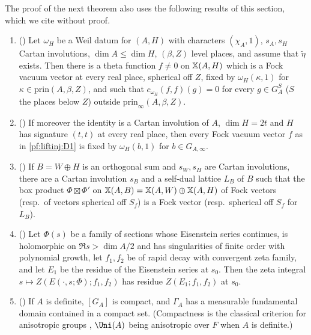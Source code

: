 The proof of the next theorem also uses the following results of this section, which we cite without proof.
\begin{enumerate}[label=(D\arabic*)]
\item\label{pf:liftinj:D1} () Let $\omega_H$ be a Weil datum for
$(A,H)$ with characters $(\chi_A,1)$, $s_A,s_H$ Cartan involutions, $\dim A\le\dim H$, $(\beta,Z)$ level places, and assume that
$\tilde\eta$ exists. Then there is a theta function $f\ne0$ on $\mathbb{X}(A,H)$ which is a Fock vacuum vector at every real place, spherical
off $Z$, fixed by $\omega_H(\kappa,1)$ for $\kappa\in\mathrm{prin}(A,\beta,Z)$, and such that $c_{\omega_H}(f,f)(g)=0$ for every $g\in G_A^{S}$
($S$ the places below $Z$) outside $\mathrm{prin}_\infty(A,\beta,Z)$.
\item\label{pf:liftinj:D2} () If moreover the identity is a Cartan
involution of $A$, $\dim H=2t$ and $H$ has signature $(t,t)$ at every real place, then every Fock vacuum vector $f$ as in \ref{pf:liftinj:D1} is fixed
by $\omega_H(b,1)$ for $b\in G_{A,\infty}$.
\item\label{pf:liftinj:D3} () If $B=W\oplus H$ is an orthogonal sum and
$s_W,s_H$ are Cartan involutions, there are a Cartan involution $s_B$ and a self-dual lattice $L_B$ of $B$ such that the box product
$\Phi\boxtimes\Phi'$ on $\mathbb{X}(A,B)=\mathbb{X}(A,W)\oplus\mathbb{X}(A,H)$ of Fock vectors (resp.\ of vectors spherical off $S_f$) is a Fock
vector (resp.\ spherical off $S_f$ for $L_B$).
\item\label{pf:liftinj:D4} () Let $\Phi(s)$ be a family of sections whose
Eisenstein series continues, is holomorphic on $\Re s>\dim A/2$ and has singularities of finite order with polynomial growth, let $f_1,f_2$ be of
rapid decay with convergent zeta family, and let $E_1$ be the residue of the Eisenstein series at $s_0$. Then the zeta integral
$s\mapsto Z(E(\cdot,s;\Phi);f_1,f_2)$ has residue $Z(E_1;f_1,f_2)$ at $s_0$.
\item\label{pf:liftinj:D6} () If $A$ is definite, $[G_A]$ is
compact, and $\Gamma_A$ has a measurable fundamental domain contained in a compact set. (Compactness is the classical criterion for anisotropic groups
\cite{Borel1963}, $\Uni(A)$ being anisotropic over $F$ when $A$ is definite.)
\end{enumerate}

